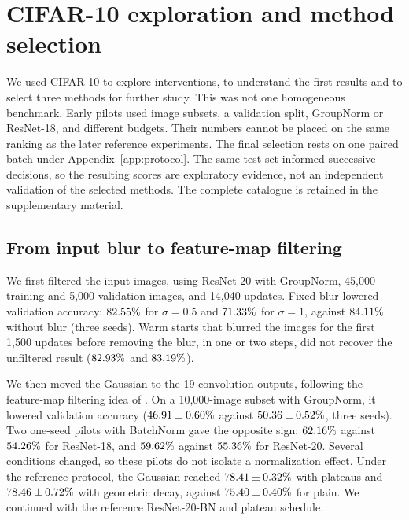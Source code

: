 \section{CIFAR-10 exploration and method selection}
\label{app:exploration}
We used CIFAR-10 to explore interventions, to understand the first results and to select three methods for further study. This was not one homogeneous benchmark. Early pilots used image subsets, a validation split, GroupNorm or ResNet-18, and different budgets. Their numbers cannot be placed on the same ranking as the later reference experiments. The final selection rests on one paired batch under Appendix~\ref{app:protocol}. The same test set informed successive decisions, so the resulting scores are exploratory evidence, not an independent validation of the selected methods. The complete catalogue is retained in the supplementary material.

\subsection{From input blur to feature-map filtering}
We first filtered the input images, using ResNet-20 with GroupNorm, 45,000 training and 5,000 validation images, and 14,040 updates. Fixed blur lowered validation accuracy: $82.55\%$ for $\sigma=0.5$ and $71.33\%$ for $\sigma=1$, against $84.11\%$ without blur (three seeds). Warm starts that blurred the images for the first 1,500 updates before removing the blur, in one or two steps, did not recover the unfiltered result ($82.93\%$ and $83.19\%$).

We then moved the Gaussian to the 19 convolution outputs, following the feature-map filtering idea of \citet{sinha2020curriculum}. On a 10,000-image subset with GroupNorm, it lowered validation accuracy ($46.91\pm0.60\%$ against $50.36\pm0.52\%$, three seeds). Two one-seed pilots with BatchNorm gave the opposite sign: $62.16\%$ against $54.26\%$ for ResNet-18, and $59.62\%$ against $55.36\%$ for ResNet-20. Several conditions changed, so these pilots do not isolate a normalization effect. Under the reference protocol, the Gaussian reached $78.41\pm0.32\%$ with plateaus and $78.46\pm0.72\%$ with geometric decay, against $75.40\pm0.40\%$ for plain. We continued with the reference ResNet-20-BN and plateau schedule.

